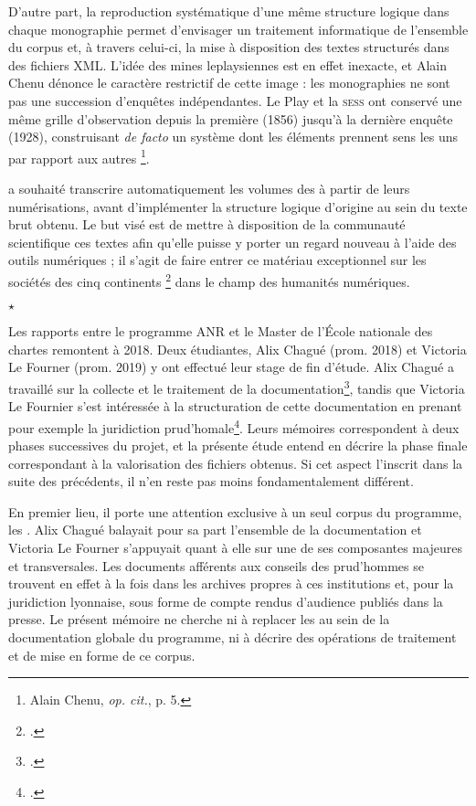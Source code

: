 D'autre part, la reproduction systématique d'une même structure logique dans chaque monographie permet d'envisager un traitement informatique de l'ensemble du corpus et, à travers celui-ci, la mise à disposition des textes structurés dans des fichiers XML. L'idée des \og mines \fg{} leplaysiennes est en effet inexacte, et Alain Chenu dénonce le caractère restrictif de cette image : les monographies ne sont pas une succession d'enquêtes indépendantes. Le Play et la \textsc{sess} ont conservé une même \og grille d'observation \fg{} depuis la première (1856) jusqu'à la dernière enquête (1928), construisant \textit{de facto} un \og système dont les éléments prennent sens les uns par rapport aux autres \fg{}\footnote{Alain Chenu, \textit{op. cit.}, p. 5.}.

\timeus{} a souhaité transcrire automatiquement les volumes des \odm{} à partir de leurs numérisations, avant d'implémenter la structure logique d'origine au sein du texte brut obtenu. Le but visé est de mettre à disposition de la communauté scientifique ces textes afin qu'elle puisse y porter un regard nouveau à l'aide des outils numériques ; il s'agit de faire entrer ce \og matériau exceptionnel sur les sociétés des cinq continents \fg{}\footcite{savoye} dans le champ des humanités numériques.

\begin{center}
$\star$
\end{center} 

Les rapports entre le programme ANR \timeus{} et le Master \tnah{} de l'École nationale des chartes remontent à 2018. Deux étudiantes, Alix Chagué (prom. 2018) et Victoria Le Fourner (prom. 2019) y ont effectué leur stage de fin d'étude. Alix Chagué a travaillé sur la collecte et le traitement de la documentation\footcite{chague}, tandis que Victoria Le Fournier s'est intéressée à la structuration de cette documentation en prenant pour exemple la juridiction prud'homale\footcite{lefourner}. Leurs mémoires correspondent à deux phases successives du projet, et la présente étude entend en décrire  la phase finale correspondant à la valorisation des fichiers obtenus. Si cet aspect l'inscrit dans la suite des précédents, il n'en reste pas moins fondamentalement différent.

En premier lieu, il porte une attention exclusive à un seul corpus du programme, les \odm. Alix Chagué balayait pour sa part l'ensemble de la documentation et Victoria Le Fourner s'appuyait quant à elle sur une de ses composantes majeures et transversales. Les documents afférents aux conseils des prud'hommes se trouvent en effet à la fois dans les archives propres à ces institutions et, pour la juridiction lyonnaise, sous forme de compte rendus d'audience publiés dans la presse. Le présent mémoire ne cherche ni à replacer les \odm{} au sein de la documentation globale du programme, ni à décrire des opérations de traitement et de mise en forme de ce corpus.

